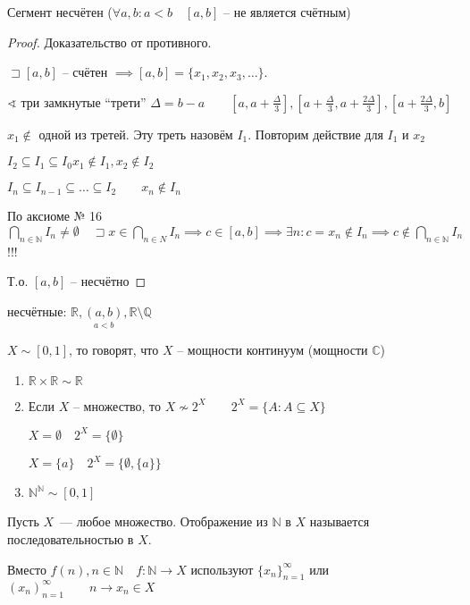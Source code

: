 \documentclass{book}
\newcommand\N{\ensuremath{\mathbb{N}}}
\newcommand\R{\ensuremath{\mathbb{R}}}
\renewcommand\O{\ensuremath{\emptyset}}
\newcommand\Q{\ensuremath{\mathbb{Q}}}
\renewcommand\C{\ensuremath{\mathbb{C}}}
\theoremstyle{definition}
\begin{document}
    \begin{theorem}
        Сегмент несчётен ($\forall a, b:a<b\quad [a,b]$ -- не является счётным)
    \end{theorem}
    \begin{proof}
        Доказательство от противного. 

        $\sqsupset [a,b]$ -- счётен $\implies [a,b] = \{x_1, x_2, x_3, \ldots\}$.

        $\sphericalangle$ три замкнутые ``трети'' $\Delta = b-a\qquad [a,a+\frac{\Delta}{3}], [a + \frac{\Delta}{3}, a + \frac{2\Delta}{3}], [a + \frac{2\Delta}{3}, b] $

        $x_1 \not\in $ одной из третей. 
        Эту треть назовём $I_1$. 
        Повторим действие для $I_1$ и $x_2$

        $I_2\subseteq I_1 \subseteq I_0 x_1\not\in I_1, x_2\not\in I_2$

        $I_n\subseteq I_{n-1}\subseteq  \ldots \subseteq  I_2\qquad x_{n} \not\in I_n $

        По аксиоме № 16 $\bigcap\limits_{n\in \N } I_n \neq \O \quad \sqsupset x\in \bigcap\limits_{n\in N} I_n \implies c\in [a,b] \implies \exists n: c = x_n\not\in I_n \implies c\not\in \bigcap\limits_{n\in \N } I_n$ !!!

        Т.о. $[a,b]$ -- несчётно
    \end{proof}
    \begin{corollary}
        несчётные: $\R, \underset{a<b}{(a,b)}, \R\setminus \Q$

        $X\sim [0,1]$, то говорят, что $X$ -- мощности континуум (мощности $\C$)
    \end{corollary}
    \begin{problem}
        \begin{enumerate}
            \item $\R\times\R\sim \R$
            \item Если $X$ -- множество, то $X\not\sim 2^X\qquad 2^X= \{A:A\subseteq X\}$

            $X = \O \quad 2^X = \{\O \}$

            $X = \{a\}\quad 2^X = \{\O , \{a\}\}$
            \item $\N ^{\N }\sim [0,1]$
         \end{enumerate}
    \end{problem}

    \begin{definition}
        Пусть $X$~--- любое множество.
        Отображение из $\N $ в $X$ называется последовательностью в $X$.

        Вместо $f(n), n\in \N \quad f:\N \to X$ используют $\{x_n\}_{n=1}^{\infty }$ или $\left( x_n \right) _{n=1}^{\infty }\qquad n\to x_n\in X$
    \end{definition}
\end{document}
